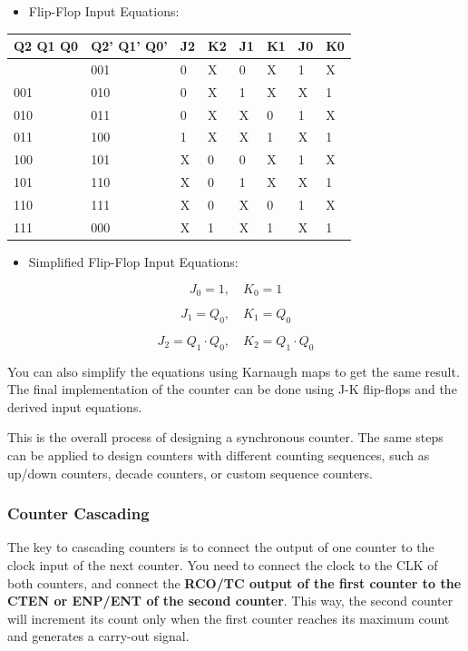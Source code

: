 \documentclass[
  a4paper,
]{article}
\providecommand{\tightlist}{%
  \setlength{\itemsep}{0pt}\setlength{\parskip}{0pt}}
\begin{document}
\begin{itemize}
\tightlist
\item
  Flip-Flop Input Equations:
\end{itemize}

\begin{longtable}[]{@{}llllllll@{}}
\toprule\noalign{}
Q2 Q1 Q0 & Q2' Q1' Q0' & J2 & K2 & J1 & K1 & J0 & K0 \\
\midrule\noalign{}
\endhead
\bottomrule\noalign{}
\endlastfoot
000 & 001 & 0 & X & 0 & X & 1 & X \\
001 & 010 & 0 & X & 1 & X & X & 1 \\
010 & 011 & 0 & X & X & 0 & 1 & X \\
011 & 100 & 1 & X & X & 1 & X & 1 \\
100 & 101 & X & 0 & 0 & X & 1 & X \\
101 & 110 & X & 0 & 1 & X & X & 1 \\
110 & 111 & X & 0 & X & 0 & 1 & X \\
111 & 000 & X & 1 & X & 1 & X & 1 \\
\end{longtable}

\begin{itemize}
\tightlist
\item
  Simplified Flip-Flop Input Equations:
\end{itemize}

\[J_0 = 1, \quad K_0 = 1\]

\[J_1 = Q_0, \quad K_1 = Q_0\]

\[J_2 = Q_1 \cdot Q_0, \quad K_2 = Q_1 \cdot Q_0\]

You can also simplify the equations using Karnaugh maps to get the same
result. The final implementation of the counter can be done using J-K
flip-flops and the derived input equations.

This is the overall process of designing a synchronous counter. The same
steps can be applied to design counters with different counting
sequences, such as up/down counters, decade counters, or custom sequence
counters.

\subsubsection{Counter Cascading}\label{counter-cascading}

The key to cascading counters is to connect the output of one counter to
the clock input of the next counter. You need to connect the clock to
the CLK of both counters, and connect the \textbf{RCO/TC output of the
first counter to the CTEN or ENP/ENT of the second counter}. This way,
the second counter will increment its count only when the first counter
reaches its maximum count and generates a carry-out signal.
\end{document}
